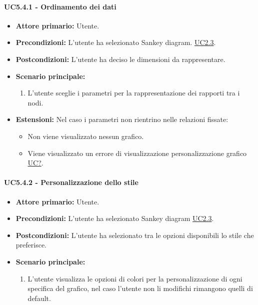 \paragraph{UC5.4.1 - Ordinamento dei dati}
\label{sec:UC5.4.1}
    \begin{itemize}
        \item \textbf{Attore primario:} Utente.
        \item \textbf{Precondizioni:} L'utente ha selezionato Sankey diagram. \hyperref[sec:UC2.3]{UC2.3}.
	    \item \textbf{Postcondizioni:} L'utente ha deciso le dimensioni da rappresentare.
	    \item \textbf{Scenario principale:}
	    \begin{enumerate}
	    		\item L'utente sceglie i parametri per la rappresentazione dei rapporti tra i nodi.
		\end{enumerate}
	    \item \textbf{Estensioni:} Nel caso i parametri non rientrino nelle relazioni fissate:
              \begin{itemize}
                  \item Non viene visualizzato nessun grafico.
                  \item Viene visualizzato un errore di visualizzazione personalizzazione grafico \hyperref[sec:UC - Errore di personalizzazione]{UC?}.
              \end{itemize}
    \end{itemize}
\paragraph{UC5.4.2 - Personalizzazione dello stile}
\label{sec:UC5.4.2}
\begin{itemize}
    \item \textbf{Attore primario:} Utente.
    \item \textbf{Precondizioni:} L'utente ha selezionato Sankey diagram \hyperref[sec:UC2.3]{UC2.3}.
	\item \textbf{Postcondizioni:} L'utente ha selezionato tra le opzioni disponibili lo stile che preferisce.
	\item \textbf{Scenario principale:}
	\begin{enumerate}
		\item L'utente visualizza le opzioni di colori per la personalizzazione di ogni specifica del grafico, nel caso l'utente non li modifichi rimangono quelli di default.
	\end{enumerate}
\end{itemize}

